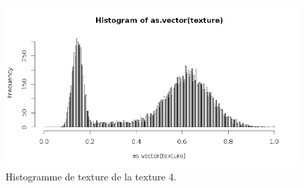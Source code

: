 \documentclass[11pt]{article}
\begin{document}
  \begin{figure}[H]
    \center
    \includegraphics[width=14cm]{../elliot/texture4.png}
    \caption{Histogramme de texture de la texture 4.}
  \end{figure}
  
\end{document}
